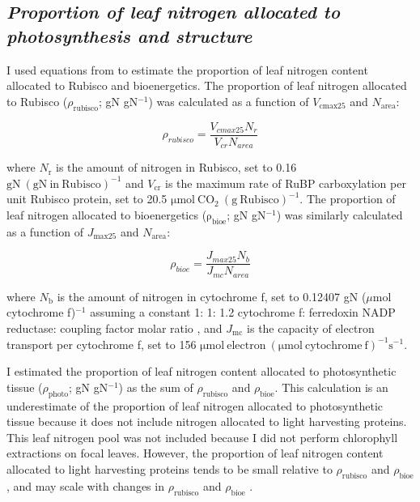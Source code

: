 \subsection{\textit{Proportion of leaf nitrogen allocated to photosynthesis and structure}}
\noindent I used equations from  to estimate the proportion of leaf nitrogen content allocated to Rubisco and bioenergetics. The proportion of leaf nitrogen allocated to Rubisco ($\rho_\mathrm{rubisco}$; gN gN$^{-1}$) was calculated as a function of $V_\mathrm{cmax25}$ and $N_\mathrm{area}$: 

\begin{equation} \label{eqn_2.9}
    \rho_{rubisco}=\frac{V_{cmax25}N_r}{V_{cr}N_{area}}
\end{equation}

\noindent where $N_\mathrm{r}$ is the amount of nitrogen in Rubisco, set to 0.16 $\mathrm{gN\ (gN\ in\ Rubisco)^{-1}}$ and $V_\mathrm{cr}$ is the maximum rate of RuBP carboxylation per unit Rubisco protein, set to 20.5 $\mathrm{\mu mol\ CO_2\ (g\ Rubisco)^{-1}}$. The proportion of leaf nitrogen allocated to bioenergetics ($\mathrm{\rho_{bioe}}$; gN gN$^{-1}$) was similarly calculated as a function of $J_\mathrm{max25}$ and $N_\mathrm{area}$:

\begin{equation} \label{eqn_2.10}
    \rho_{bioe}=\frac{J_{max25}N_b}{J_{mc}N_{area}}
\end{equation}

\noindent where $N_\mathrm{b}$ is the amount of nitrogen in cytochrome f, set to 0.12407 gN ($\mu\mathrm{mol}$ cytochrome f)$^{-1}$ assuming a constant 1: 1: 1.2 cytochrome f: ferredoxin NADP reductase: coupling factor molar ratio , and $J_\mathrm{mc}$ is the capacity of electron transport per cytochrome f, set to 156 $\mathrm{\mu mol\ electron\ (\mu mol\ cytochrome\ f)^{-1} s^{-1}}$.

I estimated the proportion of leaf nitrogen content allocated to photosynthetic tissue ($\rho_\mathrm{photo}$; gN gN$^{-1}$) as the sum of $\rho_\mathrm{rubisco}$ and $\rho_\mathrm{bioe}$. This calculation is an underestimate of the proportion of leaf nitrogen allocated to photosynthetic tissue because it does not include nitrogen allocated to light harvesting proteins. This leaf nitrogen pool was not included because I did not perform chlorophyll extractions on focal leaves. However, the proportion of leaf nitrogen content allocated to light harvesting proteins tends to be small relative to $\rho_\mathrm{rubisco}$ and $\rho_\mathrm{bioe}$, and may scale with changes in $\rho_\mathrm{rubisco}$ and $\rho_\mathrm{bioe}$ .

